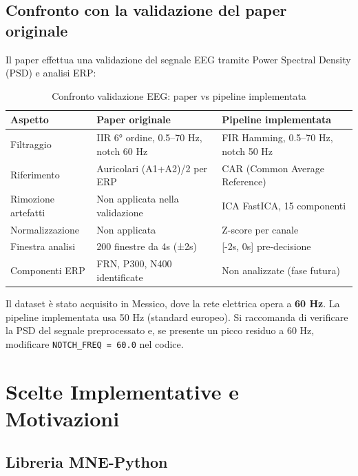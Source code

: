 \documentclass[12pt, a4paper]{article}
\begin{document}
\subsection{Confronto con la validazione del paper originale}

Il paper effettua una validazione del segnale EEG tramite Power Spectral Density (PSD) e analisi ERP:

\begin{table}[h!]
\centering
\caption{Confronto validazione EEG: paper vs pipeline implementata}
\begin{tabular}{p{4cm}p{4.5cm}p{4.5cm}}
\toprule
\textbf{Aspetto} & \textbf{Paper originale} & \textbf{Pipeline implementata} \\
\midrule
Filtraggio & IIR 6° ordine, 0.5--70 Hz, notch 60 Hz & FIR Hamming, 0.5--70 Hz, notch 50 Hz \\
Riferimento & Auricolari (A1+A2)/2 per ERP & CAR (Common Average Reference) \\
Rimozione artefatti & Non applicata nella validazione & ICA FastICA, 15 componenti \\
Normalizzazione & Non applicata & Z-score per canale \\
Finestra analisi & 200 finestre da 4s (±2s) & [-2s, 0s] pre-decisione \\
Componenti ERP & FRN, P300, N400 identificate & Non analizzate (fase futura) \\
\bottomrule
\end{tabular}
\end{table}

\begin{notabox}
Il dataset è stato acquisito in Messico, dove la rete elettrica opera a \textbf{60 Hz}. La pipeline implementata usa 50 Hz (standard europeo). Si raccomanda di verificare la PSD del segnale preprocessato e, se presente un picco residuo a 60 Hz, modificare \texttt{NOTCH\_FREQ = 60.0} nel codice.
\end{notabox}

\section{Scelte Implementative e Motivazioni}

\subsection{Libreria MNE-Python}
\end{document}
